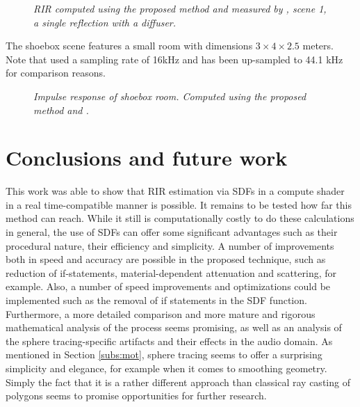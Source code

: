 \documentclass[twoside,a4paper]{article}
\begin{document}
\begin{figure}
    \begin{center}
      
    \end{center}
    
    \caption{\label{fig:diffuser} \it RIR computed using the proposed method and measured by \cite{brinkmann_round_2019}, scene 1, a single reflection with a diffuser.}
\end{figure}


The shoebox scene features a small room with dimensions $3 \times 4 \times 2.5$ meters. Note that \cite{lehmann_fast_2020} used a sampling rate of 16kHz and has been up-sampled to 44.1 kHz for comparison reasons. 

\begin{figure}
    \begin{center}
      
    \end{center}
    \caption{\label{fig:shoe} \it Impulse response of shoebox room. Computed using the proposed method and \cite{lehmann_fast_2020}. }
    
\end{figure}

\section{Conclusions and future work}
\label{sec:concl}

This work was able to show that RIR estimation via SDFs in a compute shader in a real time-compatible manner is possible. It remains to be tested how far this method can reach. While it still is computationally costly to do these calculations in general, the use of SDFs can offer some significant advantages such as their procedural nature, their efficiency and simplicity. A number of improvements both in speed and accuracy are possible in the proposed technique, such as reduction of if-statements, material-dependent attenuation and scattering, for example. Also, a number of speed improvements and optimizations could be implemented such as the removal of if statements in the SDF function. Furthermore, a more detailed comparison and more mature and rigorous mathematical analysis of the process seems promising, as well as an analysis of the sphere tracing-specific artifacts and their effects in the audio domain. As mentioned in Section \ref{subs:mot}, sphere tracing seems to offer a surprising simplicity and elegance, for example when it comes to smoothing geometry. Simply the fact that it is a rather different approach than classical ray casting of polygons seems to promise opportunities for further research. 
\end{document}

